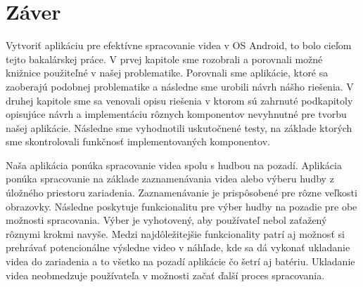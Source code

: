 \documentclass[12pt, oneside]{book}
\begin{document}




\newpage

\chapter*{Záver}

\hspace{15pt} Vytvoriť aplikáciu pre efektívne spracovanie videa v OS Android, to bolo cieľom tejto bakalárskej práce. V prvej kapitole sme rozobrali a porovnali možné knižnice použiteľné v našej problematike. Porovnali sme aplikácie, ktoré sa zaoberajú podobnej problematike a následne sme urobili návrh nášho riešenia. V druhej kapitole sme sa venovali opisu riešenia v ktorom sú zahrnuté podkapitoly opisujúce návrh a implementáciu rôznych komponentov nevyhnutné pre tvorbu našej aplikácie. Následne sme vyhodnotili uskutočnené testy, na základe ktorých sme skontrolovali funkčnosť implementovaných komponentov.

Naša aplikácia ponúka spracovanie videa spolu s hudbou na pozadí. Aplikácia ponúka spracovanie na základe zaznamenávania videa alebo výberu hudby z úložného priestoru zariadenia. Zaznamenávanie je prispôsobené pre rôzne veľkosti obrazovky. Následne poskytuje funkcionalitu pre výber hudby na pozadie pre obe možnosti spracovania. Výber je vyhotovený, aby používateľ nebol zaťažený rôznymi krokmi navyše. Medzi najdôležitejšie funkcionality patrí aj možnosť si prehrávať potencionálne výsledne video v náhľade, kde sa dá vykonať ukladanie videa do zariadenia a to všetko na pozadí aplikácie čo šetrí aj batériu. Ukladanie videa neobmedzuje používateľa v možnosti začať ďalší proces spracovania.
\end{document}
